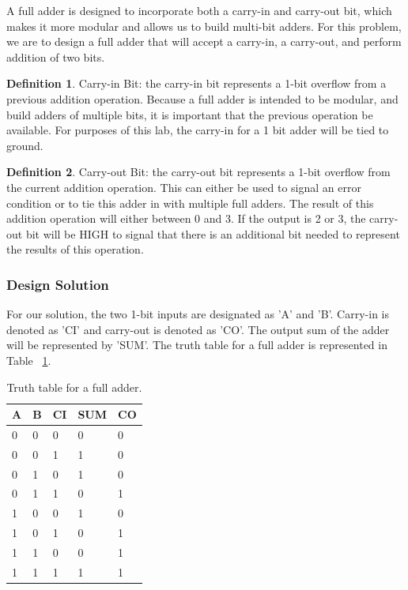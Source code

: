 \documentclass[11pt]{article}
\begin{document}
A full adder is designed to incorporate both a carry-in and carry-out bit, which makes it more modular and allows us to build multi-bit adders. For this problem, we are to design a full adder that will accept a carry-in, a carry-out, and perform addition of two bits.

\theoremstyle{definition}
\newtheorem{definition}{Definition}
\begin{definition}
Carry-in Bit: the carry-in bit represents a 1-bit overflow from a previous addition operation. Because a full adder is intended to be modular, and build adders of multiple bits, it is important that the previous operation be available. For purposes of this lab, the carry-in for a 1 bit adder will be tied to ground.
\end{definition}

\begin{definition}
	Carry-out Bit: the carry-out bit represents a 1-bit overflow from the current addition operation. This can either be used to signal an error condition or to tie this adder in with multiple full adders. The result of this addition operation will either between 0 and 3. If the output is 2 or 3, the carry-out bit will be HIGH to signal that there is an additional bit needed to represent the results of this operation.
\end{definition}

\subsubsection{Design Solution}

For our solution, the two 1-bit inputs are designated as 'A' and 'B'. Carry-in is denoted as 'CI' and carry-out is denoted as 'CO'. The output sum of the adder will be represented by 'SUM'. The truth table for a full adder is represented in Table ~\ref{tab:fullAddTruthTable}.

\begin{table}[h]
\begin{center}
	\begin{tabular}{| l | l | l | l | l |}
		\hline
		A & B & CI & SUM & CO \\ \hline
		0 & 0 & 0 & 0 & 0 \\ \hline
		0 & 0 & 1 & 1 & 0 \\ \hline
		0 & 1 & 0 & 1 & 0 \\ \hline
		0 & 1 & 1 & 0 & 1 \\ \hline
		1 & 0 & 0 & 1 & 0 \\ \hline
		1 & 0 & 1 & 0 & 1 \\ \hline
		1 & 1 & 0 & 0 & 1 \\ \hline
		1 & 1 & 1 & 1 & 1 \\ \hline
	\end{tabular}
	\caption{\label{tab:fullAddTruthTable}Truth table for a full adder.}
	\label{tab:fullAddTruthTable}
\end{center}
\end{table}
\end{document}
